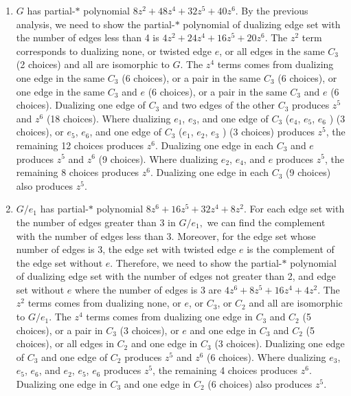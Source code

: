   \begin{enumerate}
    \item
   $G$
  has partial-$*$ polynomial $8z^{2}+48z^{4}+32z^{5}+40z^{6}$. By the previous analysis, we need to show the partial-$*$ polynomial of dualizing edge set with the number of edges less than 4 is $4z^{2}+24z^{4}+16z^{5}+20z^{6}$.
  The
$z^{2}$ term corresponds to dualizing none, or twisted edge $e$,  or all edges in the
same $C_{3}$ (2 choices) and all are isomorphic to $G$. The $z^{4}$
terms comes from dualizing one
edge in the same $C_{3}$ (6 choices),  or a pair in the same $C_{3}$ (6 choices),  or one edge in the same $C_{3}$ and $e$  (6 choices),  or a pair in the same $C_{3}$ and $e$ (6 choices). Dualizing  one edge of $C_{3}$ and  two edges of the other $C_{3}$ produces $z^{5}$ and $z^{6}$ (18 choices). Where dualizing $e_{1}$, $e_{3}$, and  one edge of $C_{3}$ ($e_{4}$, $e_{5}$,  $e_{6}$ ) (3 choices), or $e_{5}$, $e_{6}$, and  one edge of $C_{3}$ ($e_{1}$, $e_{2}$,  $e_{3}$ ) (3 choices)  produces $z^{5}$,  the remaining 12 choices produces $z^{6}$.  Dualizing  one edge in each $C_{3}$ and $e$ produces $z^{5}$ and $z^{6}$ (9 choices). Where dualizing $e_{2}$, $e_{4}$, and  $e$   produces $z^{5}$,  the remaining 8 choices produces $z^{6}$. Dualizing  one edge in each $C_{3}$ (9 choices) also produces $z^{5}$.
    \item  $ G/e_{1}$ has partial-$*$ polynomial $8z^{6}+16z^{5}+32z^{4}+8z^{2}.$ For each edge set with the number of edges greater than 3 in $G/e_{1},$ we can find the complement with the number of edges less than 3. Moreover, for the edge set whose number of edges is 3, the edge set with twisted edge $e$ is the complement of the edge set without $e$. Therefore, we need to show the partial-$*$ polynomial of dualizing edge set with the number of edges not greater than 2, and  edge set without $e$ where the number of edges is 3 are $4z^{6}+8z^{5}+16z^{4}+4z^{2}$.
  The $z^{2}$
terms comes from dualizing none, or $e$,   or $C_{3}$, or $C_{2}$ and all are isomorphic to $G/e_{1}$. The $z^{4}$
terms comes from dualizing one edge in $C_{3}$ and $C_{2}$   (5 choices),   or a pair in  $C_{3}$ (3 choices), or $e$ and one edge in $C_{3}$ and $C_{2}$ (5 choices),
or all edges in  $C_{2}$ and one edge in $C_{3}$ (3 choices). Dualizing  one edge of $C_{3}$ and  one edge of $C_{2}$  produces $z^{5}$ and $z^{6}$ (6 choices). Where dualizing $e_{3}$, $e_{5}$, $e_{6}$, and  $e_{2}$, $e_{5}$, $e_{6}$ produces $z^{5}$,  the remaining 4 choices produces $z^{6}$. Dualizing  one edge in  $C_{3}$ and one edge in $C_{2}$  (6 choices) also produces $z^{5}$.


  \end{enumerate}




